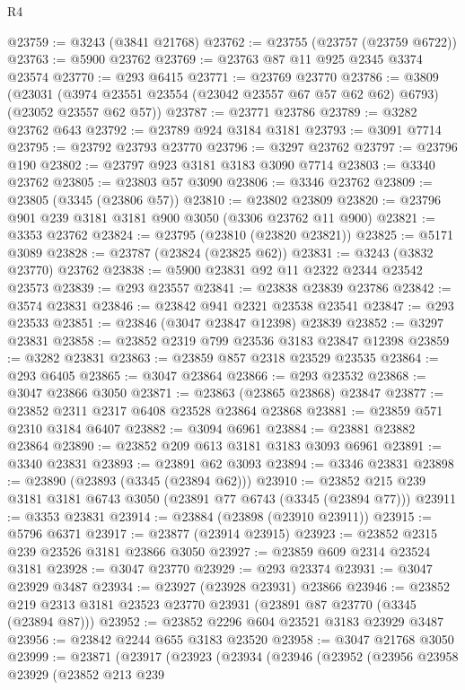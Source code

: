 \begin{lexlean}{R4}
\begin{coremodule}
@23759 := @3243 (@3841 @21768)
@23762 := @23755 (@23757 (@23759 @6722))
@23763 := @5900 @23762
@23769 := @23763 @87 @11 @925 @2345 @3374 @23574
@23770 := @293 @6415
@23771 := @23769 @23770
@23786 := @3809
    (@23031 (@3974 @23551 @23554 (@23042 @23557 @67 @57 @62 @62) @6793) (@23052 @23557 @62 @57))
@23787 := @23771 @23786
@23789 := @3282 @23762 @643
@23792 := @23789 @924 @3184 @3181
@23793 := @3091 @7714
@23795 := @23792 @23793 @23770
@23796 := @3297 @23762
@23797 := @23796 @190
@23802 := @23797 @923 @3181 @3183 @3090 @7714
@23803 := @3340 @23762
@23805 := @23803 @57 @3090
@23806 := @3346 @23762
@23809 := @23805 (@3345 (@23806 @57))
@23810 := @23802 @23809
@23820 := @23796 @901 @239 @3181 @3181 @900 @3050 (@3306 @23762 @11 @900)
@23821 := @3353 @23762
@23824 := @23795 (@23810 (@23820 @23821))
@23825 := @5171 @3089
@23828 := @23787 (@23824 (@23825 @62))
@23831 := @3243 (@3832 @23770) @23762
@23838 := @5900 @23831 @92 @11 @2322 @2344 @23542 @23573
@23839 := @293 @23557
@23841 := @23838 @23839 @23786
@23842 := @3574 @23831
@23846 := @23842 @941 @2321 @23538 @23541
@23847 := @293 @23533
@23851 := @23846 (@3047 @23847 @12398) @23839
@23852 := @3297 @23831
@23858 := @23852 @2319 @799 @23536 @3183 @23847 @12398
@23859 := @3282 @23831
@23863 := @23859 @857 @2318 @23529 @23535
@23864 := @293 @6405
@23865 := @3047 @23864
@23866 := @293 @23532
@23868 := @3047 @23866 @3050
@23871 := @23863 (@23865 @23868) @23847
@23877 := @23852 @2311 @2317 @6408 @23528 @23864 @23868
@23881 := @23859 @571 @2310 @3184 @6407
@23882 := @3094 @6961
@23884 := @23881 @23882 @23864
@23890 := @23852 @209 @613 @3181 @3183 @3093 @6961
@23891 := @3340 @23831
@23893 := @23891 @62 @3093
@23894 := @3346 @23831
@23898 := @23890 (@23893 (@3345 (@23894 @62)))
@23910 := @23852 @215 @239 @3181 @3181 @6743 @3050 (@23891 @77 @6743 (@3345 (@23894 @77)))
@23911 := @3353 @23831
@23914 := @23884 (@23898 (@23910 @23911))
@23915 := @5796 @6371
@23917 := @23877 (@23914 @23915)
@23923 := @23852 @2315 @239 @23526 @3181 @23866 @3050
@23927 := @23859 @609 @2314 @23524 @3181
@23928 := @3047 @23770
@23929 := @293 @23374
@23931 := @3047 @23929 @3487
@23934 := @23927 (@23928 @23931) @23866
@23946 := @23852 @219 @2313 @3181 @23523 @23770 @23931 (@23891 @87 @23770 (@3345 (@23894 @87)))
@23952 := @23852 @2296 @604 @23521 @3183 @23929 @3487
@23956 := @23842 @2244 @655 @3183 @23520
@23958 := @3047 @21768 @3050
@23999 := @23871
    (@23917
      (@23923
        (@23934
          (@23946
            (@23952
              (@23956
                @23958
                @23929
                (@23852
                  @213
                  @239

\end{coremodule}
\end{lexlean}
